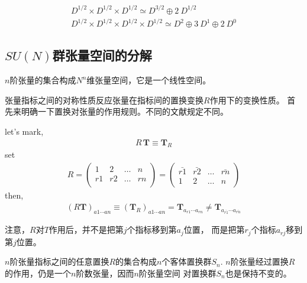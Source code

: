 \begin{example}[SU(2)]
\begin{equation}\begin{aligned}
\label{eq.8.1.3}
D^{1/2}\times D^{1/2}\times D^{1/2}\simeq D^{3/2} \oplus 2 ~ D^{1/2} \\
D^{1/2}\times D^{1/2}\times D^{1/2}\times D^{1/2}\simeq D^{2} \oplus 3~D^{1} \oplus 2~D^{0}
\end{aligned}\end{equation}
\end{example}

\subsection{$SU(N)$群张量空间的分解}
$n$阶张量的集合构成$N^n$维张量空间，它是一个线性空间。

张量指标之间的对称性质反应张量在指标间的置换变换$R$作用下的变换性质。
首先来明确一下置换对张量的作用规则。不同的文献规定不同。

\begin{newprop}
let's mark,
\begin{equation}\begin{aligned}
		\label{eq.8.1.4}
	R\,\mathbf{T}\equiv \mathbf{T}_R
\end{aligned}\end{equation}
set
\begin{equation}\begin{aligned}
\label{eq.8.1.5}
R=
\begin{pmatrix}
1&2&\ldots&n\\
r1&r2&\ldots&rn\\
\end{pmatrix}
=
\begin{pmatrix}
\bar{r1}&\bar{r2}&\ldots&\bar{rn}\\
1&2&\ldots&n
\end{pmatrix}
\end{aligned}\end{equation}
then,
\begin{equation}\begin{aligned}
(R\mathbf{T})_{a1\cdots an}\equiv (\mathbf{T}_R)_{a1\cdots an}=
\mathbf{T}_{a_{r1}\cdots a_{rn}}
\neq
\mathbf{T}_{a_{\bar{r1}}\cdots a_{\bar{rn}}}
\end{aligned}\end{equation}
\end{newprop}

\begin{note}
注意，$R$对$T$作用后，并不是把第$j$个指标移到第$a_j$位置，
而是把第$r_j$个指标$a_{rj}$移到第$j$位置。


$n$阶张量指标之间的任意置换$R$的集合构成$n$个客体置换群$S_n$.
$n$阶张量经过置换$R$的作用，仍是一个$n$阶数张量，因而$n$阶张量空间
对置换群$S_n$也是保持不变的。
\end{note}

